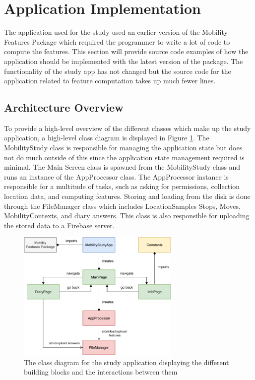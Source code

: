 \section{Application Implementation}
The application used for the study used an earlier version of the Mobility Features Package which required the programmer to write a lot of code to compute the features. This section will provide source code examples of how the application should be implemented with the latest version of the package. The functionality of the study app has not changed but the source code for the application related to feature computation takes up much fewer lines.

\subsection{Architecture Overview}
To provide a high-level overview of the different classes which make up the study application, a high-level class diagram is displayed in Figure \ref{fig:app-class-diagram}. The MobilityStudy class is responsible for managing the application state but does not do much outside of this since the application state management required is minimal. The Main Screen class is spawned from the MobilityStudy class and runs an instance of the AppProcessor class. The AppProcessor instance is responsible for a multitude of tasks, such as asking for permissions, collection location data, and computing features. Storing and loading from the disk is done through the FileManager class which includes LocationSamples Stops, Moves, MobilityContexts, and diary answers. This class is also responsible for uploading the stored data to a Firebase server.

\begin{figure}[h]
    \centering
    \includegraphics[width=0.7\textwidth]{images/diagrams/app-diagram.pdf}
    \caption{The class diagram for the study application displaying the different building blocks and the interactions between them}
    \label{fig:app-class-diagram}
\end{figure}

